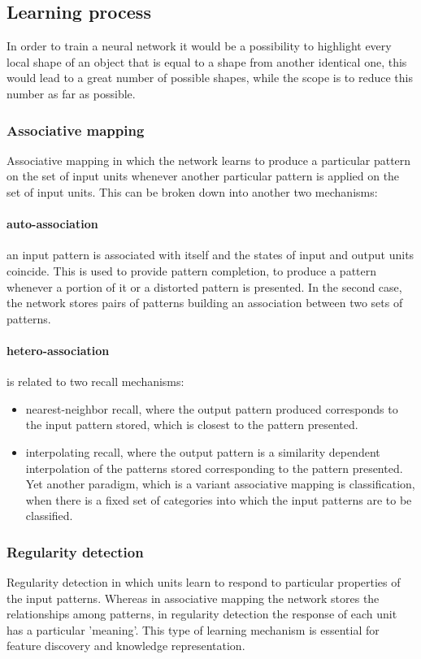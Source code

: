 \documentclass[9pt,shortpaper,twoside,web]{ieeecolor}
\begin{document}
\subsection{Learning process}
In order to train a neural network it would be a possibility to highlight every local shape of an object that is equal to a shape from another identical one, this  would lead to a great number of possible shapes, while the scope is to reduce this number as far as possible. 

\subsubsection{Associative mapping}
Associative mapping in which the network learns to produce a particular pattern on the set of input units whenever another particular pattern is applied on the set of input units. This can  be broken down into another two mechanisms:

\paragraph{auto-association}
an input pattern is associated with itself and the states of input and output units coincide. This is used to provide pattern completion, to produce a pattern whenever a portion of it or a distorted pattern is presented. In the second case, the network stores pairs of patterns building an association between two sets of patterns.

\paragraph{hetero-association}
is related to two recall mechanisms:

\begin{itemize}
\item nearest-neighbor recall, where the output pattern produced corresponds to the input pattern stored, which is closest to the pattern presented.

\item interpolating recall, where the output pattern is a similarity dependent interpolation of the patterns stored corresponding to the pattern presented. Yet another paradigm, which is a variant associative mapping is classification, when there is a fixed set of categories into which the input patterns are to be classified.
\end{itemize}

\subsubsection{Regularity detection}
Regularity detection in which units learn to respond to particular properties of the input patterns. Whereas in associative mapping the network stores the relationships among patterns, in regularity detection the response of each unit has a particular 'meaning'. This type of learning mechanism is essential for feature discovery and knowledge representation.
\end{document}
